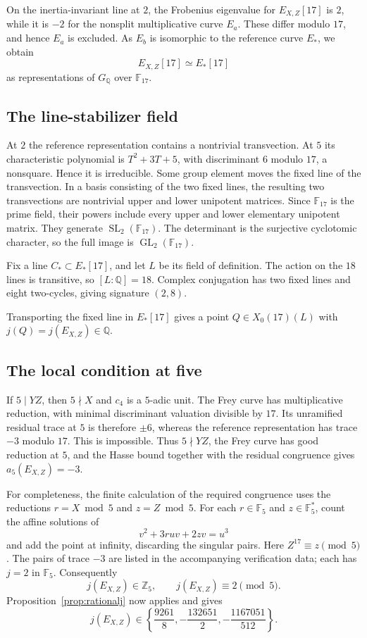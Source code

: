 \documentclass[11pt,a4paper]{article}
\theoremstyle{definition}\newtheorem{definition}[theorem]{Definition}
\theoremstyle{remark}\newtheorem{remark}[theorem]{Remark}
\newcommand{\Q}{\mathbb Q}\newcommand{\Z}{\mathbb Z}\newcommand{\F}{\mathbb F}
\begin{document}
On the inertia-invariant line at $2$, the Frobenius eigenvalue for $E_{X,Z}[17]$ is $2$, while it is $-2$ for the nonsplit multiplicative curve $E_a$. These differ modulo $17$, and hence $E_a$ is excluded. As $E_b$ is isomorphic to the reference curve $E_*$, we obtain
\[
E_{X,Z}[17]\simeq E_*[17]
\]
as representations of $G_{\mathbb Q}$ over $\mathbb F_{17}$. 
\subsection{The line-stabilizer field}

At $2$ the reference representation contains a nontrivial transvection.
At $5$ its characteristic polynomial is $T^2+3T+5$, with discriminant
$6$ modulo $17$, a nonsquare. Hence it is irreducible. Some group element
moves the fixed line of the transvection. In a basis consisting of the two
fixed lines, the resulting two transvections are nontrivial upper and
lower unipotent matrices. Since $\F_{17}$ is the prime field, their
powers include every upper and lower elementary unipotent matrix. They
generate $\operatorname{SL}_2(\F_{17})$. The determinant is the
surjective cyclotomic character, so the full image is
$\operatorname{GL}_2(\F_{17})$.

Fix a line $C_*\subset E_*[17]$, and let $L$ be its field of definition.
The action on the $18$ lines is transitive, so $[L:\Q]=18$.
Complex conjugation has two fixed lines and eight two-cycles, giving
signature $(2,8)$. 

Transporting the fixed line in $E_*[17]$ gives a point $Q\in X_0(17)(L)$ with $j(Q)=j(E_{X,Z})\in\mathbb Q$.

\subsection{The local condition at five}

If $5\mid YZ$, then $5\nmid X$ and $c_4$ is a $5$-adic unit. The Frey curve has multiplicative reduction, with minimal discriminant valuation divisible by $17$. Its unramified residual trace at $5$ is therefore $\pm6$, whereas the reference representation has trace $-3$ modulo $17$. This is impossible. Thus $5\nmid YZ$, the Frey curve has good reduction at $5$, and the Hasse bound together with the residual congruence gives $a_5(E_{X,Z})=-3$.

For completeness, the finite calculation of the required congruence uses the reductions $r=X\bmod5$ and $z=Z\bmod5$. For each $r\in\mathbb F_5$ and $z\in\mathbb F_5^*$, count the affine solutions of
\[
v^2+3ruv+2zv=u^3
\]
and add the point at infinity, discarding the singular pairs. Here $Z^{17}\equiv z\pmod5$. The pairs of trace $-3$ are listed in the accompanying verification data; each has $j=2$ in $\mathbb F_5$. Consequently
\[
j(E_{X,Z})\in\mathbb Z_5,\qquad j(E_{X,Z})\equiv2\pmod5.
\]
Proposition~\ref{prop:rationalj} now applies and gives
\[
j(E_{X,Z})\in\left\{\frac{9261}{8},-\frac{132651}{2},-\frac{1167051}{512}\right\}.
\]
\end{document}
